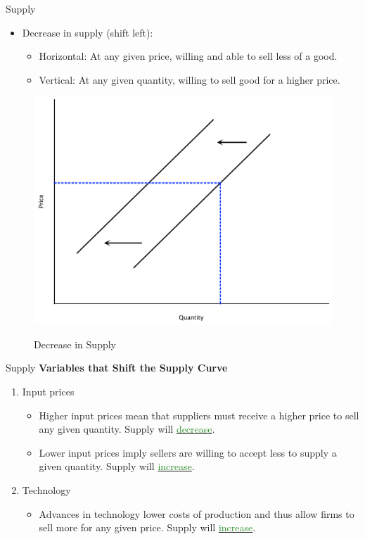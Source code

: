 \documentclass[xcolor={dvipsnames},pdf, hyperref={colorlinks=true, citecolor=ForestGreen, linkcolor=BlueViolet, urlcolor=Magenta}]{beamer}
\theoremstyle{definition}
\newcommand{\blank}[0]{}
\newcommand{\ddp}[1]{{\textcolor{ForestGreen}{#1}}}
\newcommand{\dd}[1]{{\underline{\textcolor{ForestGreen}{#1}}}}
\begin{document}
\begin{frame}{Supply}
	
	\begin{itemize}
		\item Decrease in supply (shift left): 
		\begin{itemize}
			\item Horizontal: At any given price, willing and able to sell less of a good.
			\item Vertical: At any given quantity, willing to sell good for a higher price. 
		\end{itemize}
	\end{itemize}
\blank 
\blank 
\blank 
\blank
	\begin{figure}
	\centering
	\ddp{\includegraphics[scale=.30]{plot12.pdf}}
	\caption{Decrease in Supply}
\end{figure}
	
\end{frame}

\begin{frame}{Supply}
	\textbf{Variables that Shift the Supply Curve}
		\begin{enumerate}
			\item Input prices 
			\begin{itemize}
				\item Higher input prices mean that suppliers must receive a higher price to sell any given quantity. Supply will \dd{decrease}.
				\item Lower input prices imply sellers are willing to accept less to supply a given quantity. Supply will \dd{increase}.
			\end{itemize}  
			\item Technology 
			\begin{itemize}
				\item Advances in technology lower costs of production and thus allow firms to sell more for any given price. Supply will \dd{increase}. 
			\end{itemize}
		\end{enumerate}
\end{frame}
\end{document}
